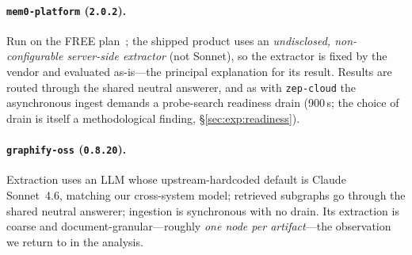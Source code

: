 \paragraph{\texttt{mem0-platform} (\texttt{2.0.2}).}
Run on the FREE plan~\citep{mem0_2024}; the shipped product uses an
\emph{undisclosed, non-configurable server-side extractor} (not Sonnet), so the
extractor is fixed by the vendor and evaluated as-is---the principal explanation
for its result. Results are routed through the shared neutral answerer, and as
with \texttt{zep-cloud} the asynchronous ingest demands a probe-search readiness
drain (900\,s; the choice of drain is itself a methodological finding,
\S\ref{sec:exp:readiness}).

\paragraph{\texttt{graphify-oss} (\texttt{0.8.20}).}
Extraction uses an LLM whose upstream-hardcoded default is Claude Sonnet~4.6,
matching our cross-system model; retrieved subgraphs go through the shared neutral
answerer; ingestion is synchronous with no drain. Its extraction is coarse and
document-granular---roughly \emph{one node per artifact}---the observation we
return to in the analysis.

